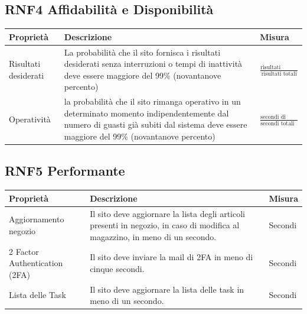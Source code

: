 \documentclass{report}
\begin{document}
\subsection*{RNF4 Affidabilità e Disponibilità}
\begin{center} %
	\centering
	\begin{tabular}{ |p{3cm}|p{4cm}|p{4cm}|  }
		\hline
		\centering Proprietà & \qquad\quad Descrizione & \qquad\qquad Misura\\ %
		\hline
		Risultati desiderati & La probabilità che il sito fornisca i risultati desiderati senza interruzioni o tempi di inattività deve essere maggiore del 99\% (novantanove percento) & $\frac{\text{risultati ricevuti con successo}}{\text{risultati totali}} $ \\ %
		\hline
		Operatività &  la probabilità che il sito rimanga operativo in un determinato momento
		indipendentemente dal numero di guasti già subiti dal sistema deve essere maggiore del 99\% (novantanove percento) & $ \frac{\text{secondi di attività dal lancio}}{\text{secondi totali dal lancio}} $\\
		\hline 
	\end{tabular}
\end{center}
\subsection*{RNF5 Performante}
\begin{center} %
	\centering
	\begin{tabular}{ |p{3cm}|p{4cm}|p{4cm}|  }
		\hline
		\centering Proprietà & \qquad\quad Descrizione & \qquad\qquad Misura\\ %
		\hline
		Aggiornamento negozio & Il sito deve aggiornare la lista degli articoli presenti in negozio, in caso di modifica al magazzino, in meno di un secondo. & Secondi \\
		\hline 
		2 Factor Authentication (2FA)& Il sito deve inviare la mail di 2FA in meno di cinque secondi. & Secondi \\
		\hline
		Lista delle Task & Il sito deve aggiornare la lista delle task in meno di un secondo. & Secondi \\ 
		\hline

	\end{tabular}
\end{center}
\end{document}
